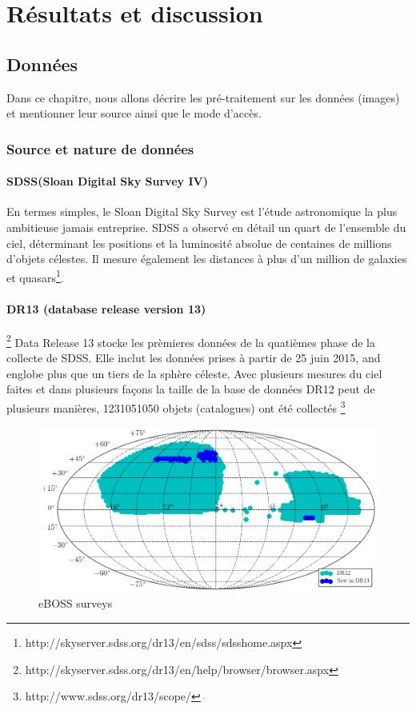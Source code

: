 \chapter{Résultats et discussion}

\section{Données}
Dans ce chapitre, nous allons décrire les pré-traitement sur les données (images) et mentionner leur source ainsi que le mode d'accès.
\subsection{Source et nature de données}

\subsubsection{SDSS(Sloan Digital Sky Survey IV)}
En termes simples, le Sloan Digital Sky Survey est l'étude astronomique la plus ambitieuse jamais entreprise. SDSS a observé en détail un quart de l'ensemble du ciel, déterminant les positions et la luminosité absolue de centaines de millions d'objets célestes\cite{sdss}. Il mesure également les distances à plus d'un million de galaxies et quasars\footnote{http://skyserver.sdss.org/dr13/en/sdss/sdsshome.aspx}. 

\subsubsection{DR13 (database release version 13)} \footnote{http://skyserver.sdss.org/dr13/en/help/browser/browser.aspx}
Data Release 13 stocke les prèmieres données de la quatièmes phase de la collecte de SDSS. Elle inclut les données prises à partir de 25 juin 2015, and englobe plus que un tiers de la sphère céleste. Avec plusieurs mesures du ciel faites et dans plusieurs façons la taille de la base de données DR12 peut de plusieurs manières, 1231051050 objets (catalogues) ont été collectés \footnote{http://www.sdss.org/dr13/scope/} 

\begin{figure}[H]
    \centering
    \includegraphics[scale = 0.5]{images/dr13_boss.png}
    \caption{eBOSS surveys}%
\end{figure}

